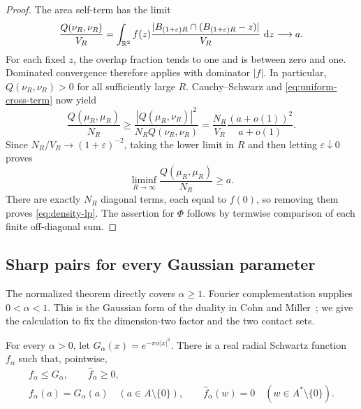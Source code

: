 \begin{proof}
The area self-term has the limit
\[
 \frac{Q(\nu_R,\nu_R)}{V_R}
 =\int_{\mathbb R^2}f(z)
   \frac{|B_{(1+\varepsilon)R}\cap(B_{(1+\varepsilon)R}-z)|}{V_R}
   \,\mathop{}\!\mathrm d z
 \longrightarrow a.
\]
For each fixed $z$, the overlap fraction tends to one and is between zero
and one.  Dominated convergence therefore applies with dominator $|f|$.
In particular, $Q(\nu_R,\nu_R)>0$ for all sufficiently large $R$.
Cauchy--Schwarz and \eqref{eq:uniform-cross-term} now yield
\[
 \frac{Q(\mu_R,\mu_R)}{N_R}
 \ge\frac{|Q(\mu_R,\nu_R)|^2}{N_RQ(\nu_R,\nu_R)}
 =\frac{N_R}{V_R}\frac{(a+o(1))^2}{a+o(1)}.
\]
Since $N_R/V_R\to(1+\varepsilon)^{-2}$, taking the lower limit in $R$
and then letting $\varepsilon\downarrow0$ proves
\[
 \liminf_{R\to\infty}\frac{Q(\mu_R,\mu_R)}{N_R}\ge a.
\]
There are exactly $N_R$ diagonal terms, each equal to $f(0)$, so removing
them proves \eqref{eq:density-lp}.  The assertion for $\Phi$ follows by
termwise comparison of each finite off-diagonal sum.
\end{proof}

\FloatBarrier

\subsection{Sharp pairs for every Gaussian parameter}

The normalized theorem directly covers $\alpha\ge1$.
Fourier complementation supplies $0<\alpha<1$.  This is the Gaussian form
of the duality in Cohn and Miller~\citep[Section~6]{CohnMiller2016}; we give the calculation
to fix the dimension-two factor and the two contact sets.

\begin{lemma}\label{lem:gaussian-duality}
For every $\alpha>0$, let $G_\alpha(x)=e^{-\pi\alpha|x|^2}$.
There is a real radial Schwartz function $f_\alpha$ such that, pointwise,
\begin{equation}\label{eq:gaussian-sharp-pair}
 \begin{gathered}
 f_\alpha\le G_\alpha,\qquad \widehat f_\alpha\ge0,\\
 f_\alpha(a)=G_\alpha(a)\quad(a\in A\setminus\{0\}),\qquad
 \widehat f_\alpha(w)=0\quad(w\in A^*\setminus\{0\}).
 \end{gathered}
\end{equation}
\end{lemma}

